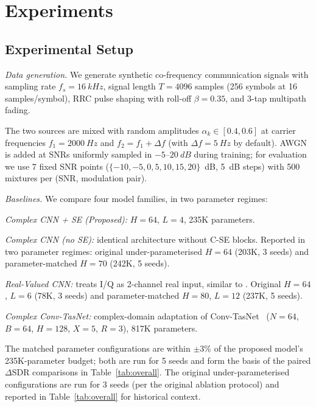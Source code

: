 \documentclass[twocolumn,english]{svjour3}
\begin{document}
\section{Experiments}
\label{sec:experiments}

\subsection{Experimental Setup}

\emph{Data generation.} We generate synthetic co-frequency communication signals with sampling rate $f_s = \SI{16}{kHz}$, signal length $T=4096$ samples (256 symbols at 16 samples/symbol), RRC pulse shaping with roll-off $\beta=0.35$, and 3-tap multipath fading.

The two sources are mixed with random amplitudes $\alpha_k \in [0.4, 0.6]$ at carrier frequencies $f_1 = \SI{2000}{Hz}$ and $f_2 = f_1 + \Delta f$ (with $\Delta f = \SI{5}{Hz}$ by default). AWGN is added at SNRs uniformly sampled in $-5$--$\SI{20}{dB}$ during training; for evaluation we use 7 fixed SNR points ($\{-10, -5, 0, 5, 10, 15, 20\}$~dB, \SI{5}{dB} steps) with 500 mixtures per (SNR, modulation pair).

\emph{Baselines.} We compare four model families, in two parameter regimes:
\begin{compactenum}\sloppy
\item \emph{Complex CNN + SE (Proposed):} $H=64$, $L=4$, 235K parameters.
\item \emph{Complex CNN (no SE):} identical architecture without C-SE blocks. Reported in two parameter regimes: original under-parameterised $H=64$ (203K, 3 seeds) and parameter-matched $H=70$ (242K, 5 seeds).
\item \emph{Real-Valued CNN:} treats I/Q as 2-channel real input, similar to \cite{hou2022single}. Original $H=64$, $L=6$ (78K, 3 seeds) and parameter-matched $H=80$, $L=12$ (237K, 5 seeds).
\item \emph{Complex Conv-TasNet:} complex-domain adaptation of Conv-TasNet~\cite{luo2019conv} ($N=64$, $B=64$, $H=128$, $X=5$, $R=3$), 817K parameters.
\end{compactenum}
\begin{sloppypar}
The matched parameter configurations are within $\pm 3\%$ of the proposed model's 235K-parameter budget; both are run for 5 seeds and form the basis of the paired $\Delta$SDR comparisons in Table~\ref{tab:overall}. The original under-parameterised configurations are run for 3 seeds (per the original ablation protocol) and reported in Table~\ref{tab:overall} for historical context.
\end{sloppypar}
\end{document}
